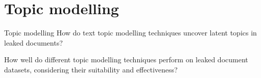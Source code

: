 \section{Topic modelling}

\begin{frame}{Topic modelling}
How do text topic modelling techniques uncover latent topics in leaked documents?

How well do different topic modelling techniques perform on leaked document datasets, considering their suitability and effectiveness?
\end{frame}